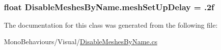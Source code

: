 \subsubsection[{\texorpdfstring{mesh\+Set\+Up\+Delay}{meshSetUpDelay}}]{\setlength{\rightskip}{0pt plus 5cm}float Disable\+Meshes\+By\+Name.\+mesh\+Set\+Up\+Delay = .\+2f}\hypertarget{class_disable_meshes_by_name_a36177b074485adab49e88f98da4cf0f4}{}\label{class_disable_meshes_by_name_a36177b074485adab49e88f98da4cf0f4}


The documentation for this class was generated from the following file\+:\begin{DoxyCompactItemize}
\item 
Mono\+Behaviours/\+Visual/\hyperlink{_disable_meshes_by_name_8cs}{Disable\+Meshes\+By\+Name.\+cs}\end{DoxyCompactItemize}

